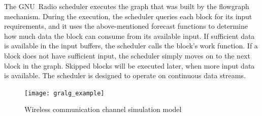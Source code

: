 The GNU~Radio scheduler executes the graph that was built by the flowgraph mechanism. During the execution, the scheduler queries each block for its input requirements, and it uses the above-mentioned forecast functions to determine how much data the block can consume from its available input. If sufficient data is available in the input buffers, the scheduler calls the block's work function. If a block does not have sufficient input, the scheduler simply moves on to the next block in the graph. Skipped blocks will be executed later, when more input data is available. The scheduler is designed to operate on continuous data streams.
%
\begin{figure}[thb]
\centering
\texttt{[image: gralg\_example]}
\caption{Wireless communication channel simulation model}\label{fig:gralg_example}
\end{figure}







